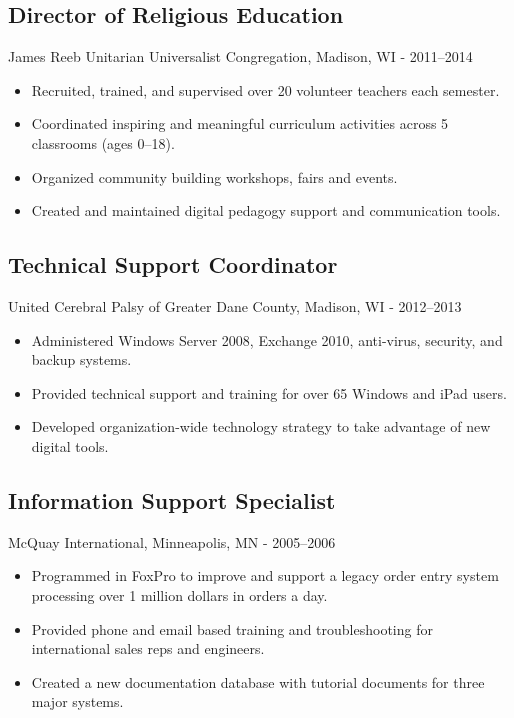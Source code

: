 \documentclass[../main.tex]{subfiles}
\begin{document}
\subsection*{Director of Religious Education}
     James Reeb Unitarian Universalist Congregation, Madison, WI - 2011--2014
	\begin{itemize}
		\item{Recruited, trained, and supervised over 20 volunteer teachers each semester.}
		\item{Coordinated inspiring and meaningful curriculum activities across 5 classrooms (ages 0--18).}
		\item{Organized community building workshops, fairs and events.}
		\item{Created and maintained digital pedagogy support and communication tools.}
	\end{itemize}

\subsection*{Technical Support Coordinator}
     United Cerebral Palsy of Greater Dane County, Madison, WI - 2012--2013
	\begin{itemize}
		\item{Administered Windows Server 2008, Exchange 2010, anti-virus, security, and backup systems.}
		\item{Provided technical support and training for over 65 Windows and iPad users.}
		\item{Developed organization-wide technology strategy to take advantage of new digital tools.}
	\end{itemize}

\subsection*{Information Support Specialist}
     McQuay International, Minneapolis, MN - 2005--2006
	\begin{itemize}
		\item{Programmed in FoxPro to improve and support a legacy order entry system processing over 1 million dollars in orders a day.}
		\item{Provided phone and email based training and troubleshooting for international sales reps and engineers.}
		\item{Created a new documentation database with tutorial documents for three major systems.}
	\end{itemize}
\end{document}
